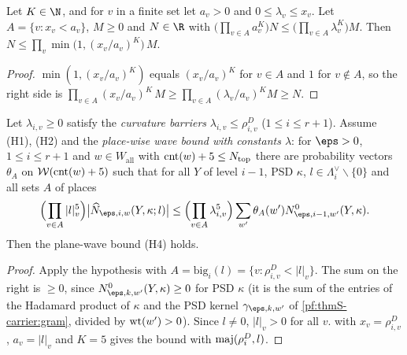 \begin{lemma}\label{pf:thmS-carrier:combine}
Let $K\in\N$, and for $v$ in a finite set let $a_v>0$ and $0\le\lambda_v\le x_v$. Let $A=\{v:x_v<a_v\}$, $M\ge0$ and $N\in\R$
with $\bigl(\prod_{v\in A}a_v^K\bigr)N\le\bigl(\prod_{v\in A}\lambda_v^K\bigr)M$. Then
$N\le\prod_v\min\bigl(1,(x_v/a_v)^K\bigr)\,M$.
\end{lemma}

\begin{proof}
$\min(1,(x_v/a_v)^K)$ equals $(x_v/a_v)^K$ for $v\in A$ and $1$ for $v\notin A$, so the right side is
$\prod_{v\in A}(x_v/a_v)^K\,M\ge\prod_{v\in A}(\lambda_v/a_v)^KM\ge N$.
\end{proof}

\begin{lemma}\label{pf:thmS-carrier:planewave}
Let $\lambda_{i,v}\ge0$ satisfy the \emph{curvature barriers} $\lambda_{i,v}\le\rho^D_{i,v}$ ($1\le i\le r+1$). Assume (H1),
(H2) and the \emph{place-wise wave bound with constants $\lambda$}: for $\eps>0$, $1\le i\le r+1$ and $w\in W_{\mathrm{all}}$
with $\operatorname{cnt}(w)+5\le N_{\mathrm{top}}$ there are probability vectors $\theta_A$ on
$\mathcal{W}(\operatorname{cnt}(w)+5)$ such that for all $Y$ of level $i-1$, PSD $\kappa$, $l\in\Lambda^\vee_i\smallsetminus
\{0\}$ and all sets $A$ of places
\[
\Bigl(\prod_{v\in A}|l|_v^5\Bigr)\bigl|\thmScarrierNhat_{\eps,i,w}(Y,\kappa;l)\bigr|\le\Bigl(\prod_{v\in A}
\lambda_{i,v}^5\Bigr)\sum_{w'}\theta_A(w')\thmScarrierNz_{\eps,i-1,w'}(Y,\kappa).
\]
Then the plane-wave bound (H4) holds.
\end{lemma}

\begin{proof}
Apply the hypothesis with $A=\mathrm{big}_i(l)=\{v:\rho^D_{i,v}<|l|_v\}$. The sum on the right is $\ge0$, since
$\thmScarrierNz_{\eps,k,w'}(Y,\kappa)\ge0$ for PSD $\kappa$ (it is the sum of the entries of the Hadamard product of $\kappa$
and the PSD kernel $\gamma_{\eps,k,w'}$ of \cref{pf:thmS-carrier:gram}, divided by $\operatorname{wt}(w')>0$). Since $l\ne0$,
$|l|_v>0$ for all $v$.  with $x_v=\rho^D_{i,v}$, $a_v=|l|_v$ and $K=5$ gives the bound with
$\operatorname{maj}(\rho^D_i,l)$.
\end{proof}

